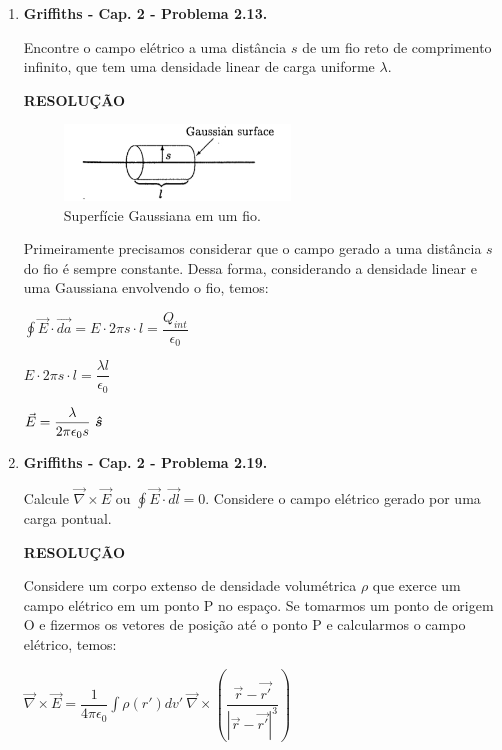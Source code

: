 \documentclass[11pt,a4paper]{article}
\newcommand{\mat}[1]{\mbox{\boldmath{$#1$}}}
\begin{document}
\begin{enumerate}
\item \textbf{Griffiths - Cap. 2 - Problema 2.13.}

Encontre o campo elétrico a uma distância $s$ de um fio reto de comprimento infinito, que tem uma densidade linear de carga uniforme $\lambda$. 

\textbf{RESOLUÇÃO}

\begin{figure}[h]	
\centering %
\includegraphics[width=6cm]{Selection_078.jpg} 
\caption{Superfície Gaussiana em um fio.}
\end{figure}

Primeiramente precisamos considerar que o campo gerado a uma distância $s$ do fio é sempre constante. Dessa forma, considerando a densidade linear e uma Gaussiana envolvendo o fio, temos:

\begin{center}
$\displaystyle\oint \vec{E} \cdot \vec{da} = E \cdot 2\pi s \cdot l = \displaystyle\dfrac{Q_{int}}{\epsilon_0} $
\end{center}

\begin{center}
$E \cdot 2\pi s \cdot l = \displaystyle\dfrac{\lambda l}{\epsilon_0} $
\end{center}

\begin{center}
$\vec{E} = \displaystyle\dfrac{\lambda}{2\pi \epsilon_0 s} \ \mat{\hat{s}} $
\end{center}

\item \textbf{Griffiths - Cap. 2 - Problema 2.19.}

Calcule $\vec{\nabla} \times \vec{E}$ ou $\displaystyle\oint \vec{E} \cdot \vec{dl} = 0$. Considere o campo elétrico gerado por uma carga pontual. 


\textbf{RESOLUÇÃO}

Considere um corpo extenso de densidade volumétrica $\rho$ que exerce um campo elétrico em um ponto P no espaço. Se tomarmos um ponto de origem O e fizermos os vetores de posição até o ponto P e calcularmos o campo elétrico, temos:

\begin{center}
$\vec{\nabla} \times \vec{E} = \displaystyle\dfrac{1}{4 \pi \epsilon_0} \displaystyle\int \rho (r')dv'\ \vec{\nabla} \times \left(\displaystyle\dfrac{\vec{r} - \vec{r'}}{|\vec{r} - \vec{r'}|^3}\right) $
\end{center}


\end{enumerate}
\end{document}
